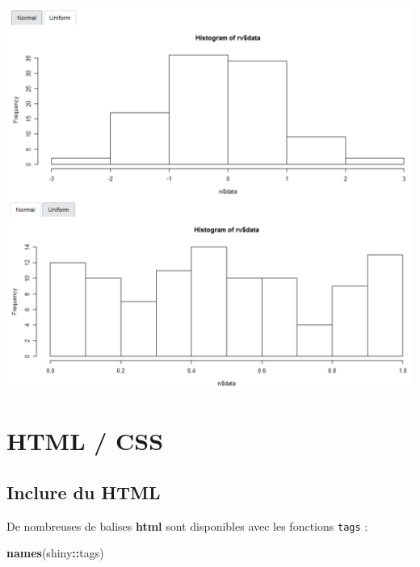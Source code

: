 \documentclass[
]{article}
\newenvironment{Shaded}{\begin{snugshade}}{\end{snugshade}}
\newcommand{\FunctionTok}[1]{\textcolor[rgb]{0.13,0.29,0.53}{\textbf{#1}}}
\newcommand{\NormalTok}[1]{#1}
\newcommand{\SpecialCharTok}[1]{\textcolor[rgb]{0.81,0.36,0.00}{\textbf{#1}}}
\begin{document}
\includegraphics{img/RV.png}

\hypertarget{html-css}{%
\section{HTML / CSS}\label{html-css}}

\hypertarget{inclure-du-html}{%
\subsection{Inclure du HTML}\label{inclure-du-html}}

De nombreuses de balises \textbf{html} sont disponibles avec les
fonctions \texttt{tags} :

\begin{Shaded}
\begin{Highlighting}[]
\FunctionTok{names}\NormalTok{(shiny}\SpecialCharTok{::}\NormalTok{tags)}
\end{Highlighting}
\end{Shaded}
\end{document}

